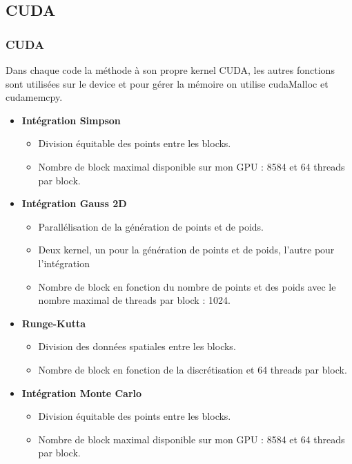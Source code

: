 \documentclass[10pt]{beamer}
\begin{document}
\subsection{CUDA}
\begin{frame}
    \frametitle{CUDA}
        \small
    Dans chaque code la méthode à son propre kernel CUDA, les autres fonctions sont utilisées sur le device et pour gérer la mémoire on utilise cudaMalloc et cudamemcpy.
    \begin{itemize}
     \item \textbf{Intégration Simpson}
            \begin{itemize}
                \item Division équitable des points entre les blocks.
                \item Nombre de block maximal disponible sur mon GPU : 8584 et 64 threads par block.
            \end{itemize}
        \item \textbf{Intégration Gauss 2D}
            \begin{itemize}
                \item Parallélisation de la génération de points et de poids.
                \item Deux kernel, un pour la génération de points et de poids, l'autre pour l'intégration
                \item Nombre de block en fonction du nombre de points et des poids avec le nombre maximal de threads par block : 1024. 
            \end{itemize}
        \item \textbf{Runge-Kutta}
            \begin{itemize}
                \item Division des données spatiales entre les blocks.
                \item Nombre de block en fonction de la discrétisation et 64 threads par block.
            \end{itemize}
        \item \textbf{Intégration Monte Carlo }
            \begin{itemize}
                \item Division équitable des points entre les blocks.
                \item Nombre de block maximal disponible sur mon GPU : 8584 et 64 threads par block.
            \end{itemize}
        
       
    \end{itemize}
\end{frame}
\end{document}
